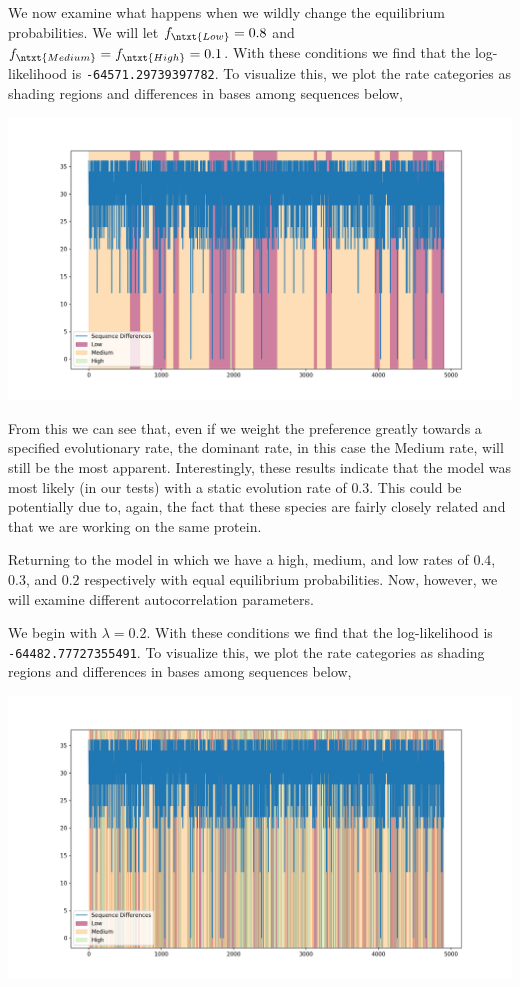 \documentclass[12pt]{article}
\begin{document}
    We now examine what happens when we wildly change the equilibrium probabilities.
    We will let $f_{\ntxt{Low}} = 0.8$ and $f_{\ntxt{Medium}} = f_{\ntxt{High}} = 0.1$.
    With these conditions we find that the log-likelihood is \texttt{-64571.29739397782}.
    To visualize this, we plot the rate categories as shading regions and differences in bases among sequences below,
    \begin{center}
        \includegraphics[scale=0.5]{../figs/high_med_low_weighted_low.png}
    \end{center}

    From this we can see that, even if we weight the preference greatly towards a specified evolutionary rate, the dominant rate, in this case the Medium rate, will still be the most apparent.
    Interestingly, these results indicate that the model was most likely (in our tests) with a static evolution rate of $0.3$.
    This could be potentially due to, again, the fact that these species are fairly closely related and that we are working on the same protein.

    Returning to the model in which we have a high, medium, and low rates of $0.4$, $0.3$, and $0.2$ respectively with equal equilibrium probabilities.
    Now, however, we will examine different autocorrelation parameters.

    We begin with $\lambda = 0.2$.
    With these conditions we find that the log-likelihood is \texttt{-64482.77727355491}.
    To visualize this, we plot the rate categories as shading regions and differences in bases among sequences below,
    \begin{center}
        \includegraphics[scale=0.5]{../figs/high_med_low_low_lambda.png}
    \end{center}
\end{document}
